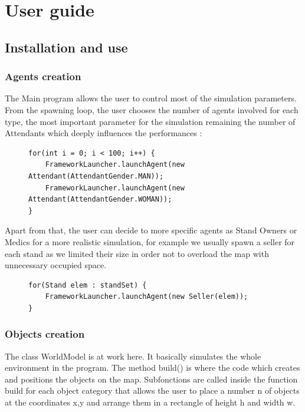 \chapter{User guide}

\section{Installation and use}
 
\subsection{Agents creation}

The Main program allows the user to control most of the simulation parameters.
From the spawning loop, the user chooses the number of agents involved for each type, the most important parameter for the simulation remaining the number of Attendants which deeply influences the performances :\\

\begin{figure}[h]
	\begin{verbatim}
for(int i = 0; i < 100; i++) {
	FrameworkLauncher.launchAgent(new Attendant(AttendantGender.MAN));
	FrameworkLauncher.launchAgent(new Attendant(AttendantGender.WOMAN));
}
	\end{verbatim}
\end{figure}

Apart from that, the user can decide to more specific agents as Stand Owners or Medics for a more realistic simulation, for example we usually spawn a seller for each stand as we limited their size in order not to overload the map with unnecessary occupied space.

\begin{figure}[h]
	\begin{verbatim}
for(Stand elem : standSet) {
	FrameworkLauncher.launchAgent(new Seller(elem));
}
	\end{verbatim}
\end{figure}

\subsection{Objects creation}

The class WorldModel is at work here. It basically simulates the whole environment in the program.
The method build() is where the code which creates and positions the objects on the map.
Subfonctions are called inside the function build for each object category that allows the user to place a number n of objects at the coordinates x,y and arrange them in a rectangle of height h and width w.

